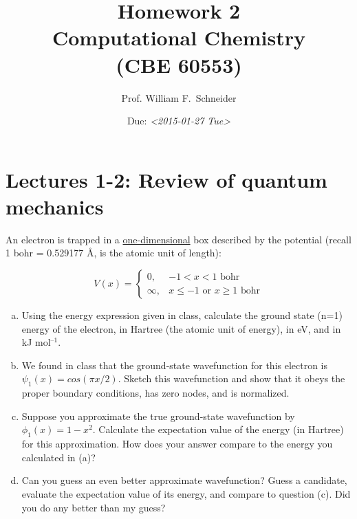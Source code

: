 \documentclass[11pt]{article}
\date{Due: \textit{<2015-01-27 Tue>}}
\title{}
\begin{document}
\title{Homework 2\\Computational Chemistry\\(CBE 60553)}
\author{Prof. William F.\ Schneider}
\maketitle


\section{Lectures 1-2: Review of quantum mechanics}
\label{sec-1}

An electron is trapped in a \uline{one-dimensional} box described by the potential (recall 1 bohr = 0.529177 Å, is the atomic unit of length):

\begin{center}
\begin{equation}
    V(x)= 
\begin{cases}
    0, & -1  < x < 1  \text{ bohr} \\
    \infty, & x \leq -1 \text{ or } x \geq 1  \text{ bohr}
\end{cases}
\end{equation}
\end{center}

\begin{enumerate}[(a)]
\item Using the energy expression given in class, calculate the ground state (n=1) energy of the electron, in Hartree (the atomic unit of energy), in eV, and in kJ mol$^{\text{–1}}$.

\item We found in class that the ground-state wavefunction for this electron is $\psi_{1}(x) = cos (\pi x/2)$. Sketch this wavefunction and show that it obeys the proper boundary conditions, has zero nodes, and is normalized.

\item Suppose you approximate the true ground-state wavefunction by $\phi_{1}(x) = 1 - x^{2}$. Calculate the expectation value of the energy (in Hartree) for this approximation. How does your answer compare to the energy you calculated in (a)?

\item Can you guess an even better approximate wavefunction? Guess a candidate, evaluate the expectation value of its energy, and compare to question (c). Did you do any better than my guess?
\end{enumerate}
\end{document}
